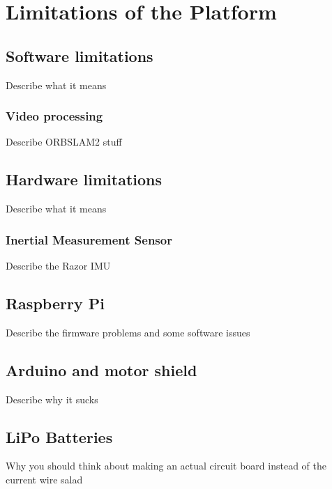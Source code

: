 \chapter{Limitations of the Platform}\label{cha:PlatformLimits}
\section{Software limitations}
Describe what it means

\subsection{Video processing}
Describe ORBSLAM2 stuff

\section{Hardware limitations}
Describe what it means

\subsection{Inertial Measurement Sensor}
Describe the Razor IMU

\section{Raspberry Pi}
Describe the firmware problems and some software issues

\section{Arduino and motor shield}
Describe why it sucks

\section{LiPo Batteries}
Why you should think about making an actual circuit board instead of the current wire salad
